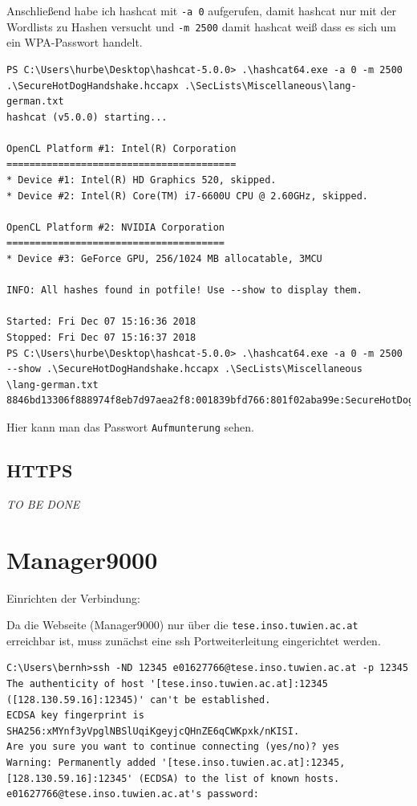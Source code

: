 \documentclass[12pt,a4paper,titlepage,oneside]{scrartcl}
\newcommand{\lang}{de}
\begin{document}
Anschließend habe ich hashcat mit \lstinline{-a 0} aufgerufen, damit hashcat nur mit der Wordlists zu Hashen versucht und \lstinline{-m 2500} damit hashcat weiß dass es sich um ein WPA-Passwort handelt.

\begin{lstlisting}
PS C:\Users\hurbe\Desktop\hashcat-5.0.0> .\hashcat64.exe -a 0 -m 2500 .\SecureHotDogHandshake.hccapx .\SecLists\Miscellaneous\lang-german.txt
hashcat (v5.0.0) starting...

OpenCL Platform #1: Intel(R) Corporation
========================================
* Device #1: Intel(R) HD Graphics 520, skipped.
* Device #2: Intel(R) Core(TM) i7-6600U CPU @ 2.60GHz, skipped.

OpenCL Platform #2: NVIDIA Corporation
======================================
* Device #3: GeForce GPU, 256/1024 MB allocatable, 3MCU

INFO: All hashes found in potfile! Use --show to display them.

Started: Fri Dec 07 15:16:36 2018
Stopped: Fri Dec 07 15:16:37 2018
PS C:\Users\hurbe\Desktop\hashcat-5.0.0> .\hashcat64.exe -a 0 -m 2500 --show .\SecureHotDogHandshake.hccapx .\SecLists\Miscellaneous
\lang-german.txt
8846bd13306f888974f8eb7d97aea2f8:001839bfd766:801f02aba99e:SecureHotDog:Aufmunterung
\end{lstlisting}

Hier kann man das Passwort \lstinline{Aufmunterung} sehen.

\subsection{HTTPS}
\emph{TO BE DONE}

\section{Manager9000}

Einrichten der Verbindung:

Da die Webseite (Manager9000) nur über die \lstinline{tese.inso.tuwien.ac.at} erreichbar ist, muss zunächst eine ssh Portweiterleitung eingerichtet werden.

\begin{lstlisting}
C:\Users\bernh>ssh -ND 12345 e01627766@tese.inso.tuwien.ac.at -p 12345
The authenticity of host '[tese.inso.tuwien.ac.at]:12345 ([128.130.59.16]:12345)' can't be established.
ECDSA key fingerprint is SHA256:xMYnf3yVpglNBSlUqiKgeyjcQHnZE6qCWKpxk/nKISI.
Are you sure you want to continue connecting (yes/no)? yes
Warning: Permanently added '[tese.inso.tuwien.ac.at]:12345,[128.130.59.16]:12345' (ECDSA) to the list of known hosts.
e01627766@tese.inso.tuwien.ac.at's password:
\end{lstlisting}
\end{document}
